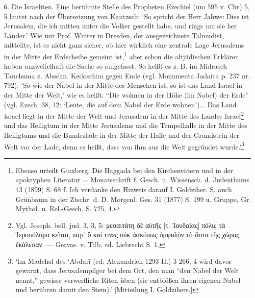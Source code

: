 \documentclass[a4paper, 11pt, oneside]{article}
\begin{document}
6. Die Israeliten. Eine berühmte Stelle des Propheten Ezechiel (um 595 v. Chr) 5, 5 lautet nach der Übersetzung von Kautzsch: `So spricht der Herr Jahwe: Dies ist Jerusalem, die ich mitten unter die Volker gestellt habe, und rings um sie her Länder.' Wie mir Prof. Winter in Dresden, der ausgezeichnete Talmudist, mitteilte, ist es nicht ganz sicher, ob hier wirklich eine zentrale Lage Jerusalems in der Mitte der Erdscheibe gemeint ist,\footnote{Ebenso urteilt Ginzberg, Die Haggada bei den Kirchenvätern und in der apokryphen Literatur = Monatsschrift f. Gesch. u. Wissensch. d. Judenthums 43 (1899) S. 68 f. Ich verdanke den Hinweis darauf I. Goldziher. S. auch Grünbaum in der Ztschr. d. D. Morgenl. Ges. 31 (1877) S. 199 u. Gruppe, Gr. Mythol. u. Rel.-Gesch. S. 725, 4.} aber schon die altjüdischen Erklärer haben unzweifelhaft die Sache so aufgefasst. So heißt es z. B. im Midrasch Tanchuma z. Abschn. Kedoschim gegen Ende (vgl. Monumenta Jadaica p. 237 nr. 792): `So wie der Nabel in der Mitte des Menschen ist, so ist das Land Israel in der Mitte der Welt,' wie es heißt: "`Die wohnen in der Höhe (im Nabel) der Erde"' (vgl. Ezech. 38, 12: `Leute, die auf dem Nabel der Erde wohnen')... Das Land Israel liegt in der Mitte der Welt und Jerusalem in der Mitte des Landes Israel\footnote{Vgl. Joseph. bell. jud. 3, 3, 5: μεσαιτάτη δὲ αὐτῆς [τ. Ἰουδαίας] πόλις τὰ Ἱεροσόλυμα κεῖται, παρ᾽ ὃ καί τινες οὐκ ἀσκόπως ὀμφαλὸν τὸ ἄστυ τῆς χώρας ἐκάλεσαν. --- Gervas. v. Tilb. ed. Liebrecht S. 1.} und das Heiligtum in der Mitte Jerusalems und die Tempelhalle in der Mitte des Heiligtums und die Bundeslade in der Mitte der Halle und der Grundstein der Welt vor der Lade, denn es heißt, dass von ihm aus die Welt gegründet wurde.'\footnote{`Im Madchal des `Abdarī (ed. Alexandrien 1293 H.) 3 266, 4 wird davor gewarnt, dass Jerusalempilger bei dem Ort, den man "`den Nabel der Welt nennt,"' gewisse verwerfliche Riten üben (sie entblößen ihren eigenen Nabel und berühren damit den Stein).' [Mitteilung I. Goldzihers.]}
\end{document}
